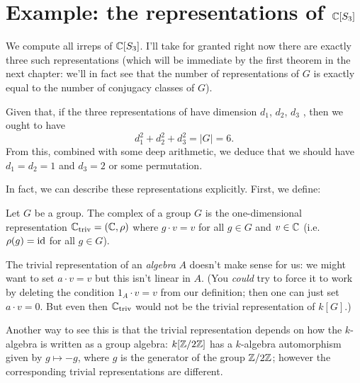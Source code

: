 \section{Example: the representations of $\mathbb C[S_3]$}
We compute all irreps of $\mathbb C[S_3]$.
I'll take for granted right now there are exactly three such representations
(which will be immediate by the first theorem in the next chapter:
we'll in fact see that the number of representations of $G$
is exactly equal to the number of conjugacy classes of $G$).

Given that, if the three representations of have dimension $d_1$, $d_2$, $d_3$ ,
then we ought to have
\[ d_1^2 + d_2^2 + d_3^2 = |G| = 6. \]
From this, combined with some deep arithmetic,
we deduce that we should have $d_1 = d_2 = 1$ and $d_3 = 2$
or some permutation.

In fact, we can describe these representations explicitly.
First, we define:
\begin{definition}
	Let $G$ be a group.
	The complex  of a group $G$
	is the one-dimensional representation $\mathbb C_{\mathrm{triv}} = (\mathbb C, \rho)$
	where $g \cdot v = v$ for all $g \in G$ and $v \in \mathbb C$
	(i.e.\ $\rho(g) = \mathrm{id}$ for all $g \in G$).
\end{definition}
\begin{remark}
	[Warning] The trivial representation of an \emph{algebra} $A$
	doesn't make sense for us:
	we might want to set $a \cdot v = v$ but this isn't linear in $A$.
	(You \emph{could} try to force it to work by
	deleting the condition $1_A \cdot v = v$ from our definition;
	then one can just set $a \cdot v = 0$.
	But even then $\mathbb C_{\mathrm{triv}}$ would not be the trivial representation of $k[G]$.)

	Another way to see this is that the trivial representation
	depends on how the $k$-algebra is written as a group algebra:
	$k[\mathbb Z/2\mathbb Z]$ has a $k$-algebra automorphism given by $g \mapsto-g$, where
	$g$ is the generator of the group $\mathbb Z/2\mathbb Z$; however the corresponding
	trivial representations are different.
\end{remark}

